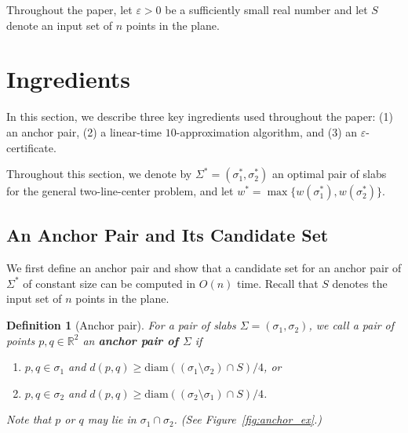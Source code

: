 \documentclass[10pt,a4paper]{article}
\newtheorem{definition}[theorem]{Definition}
\theoremstyle{star}
\theoremstyle{claimstar}
\newcommand{\eps}{\ensuremath{\varepsilon}}
\newcommand{\diam}{\ensuremath{\mathrm{diam}}}
\begin{document}
Throughout the paper, let $\eps > 0$ be a sufficiently small real number and let $S$ denote an input set of $n$ points in the plane.


\section{Ingredients}
\label{sec:polyeps}

In this section, we describe three key ingredients used throughout the paper: (1) an anchor pair, (2) a linear-time $10$-approximation algorithm, and (3) an $\eps$-certificate.




Throughout this section, we denote by $\Sigma^* = (\sigma_1^*, \sigma_2^*)$ an optimal pair of slabs for the general two-line-center problem, and let $w^* = \max \{w(\sigma_1^*), w(\sigma_2^*) \}$.

\subsection{An Anchor Pair and Its Candidate Set}
\label{sec:anchor_pair}
We first define an anchor pair and show that a candidate set for an anchor pair of $\Sigma^*$ of constant size can be computed in $O(n)$ time.
Recall that $S$ denotes the input set of $n$ points in the plane.

\begin{definition}[Anchor pair]
    For a pair of slabs $\Sigma = (\sigma_1, \sigma_2)$,
    we call a pair of points $p, q \in \mathbb R^2$ an \textbf{anchor pair of $\Sigma$} if 
    \begin{enumerate}[(1)]
        \item $p, q\in \sigma_1$ and $d(p, q) \ge \diam((\sigma_1 \setminus \sigma_2) \cap S)/4$, or 
        \item $p, q\in \sigma_2$ and $d(p, q) \ge \diam((\sigma_2 \setminus \sigma_1) \cap S)/4$.
    \end{enumerate}
     Note that $p$ or $q$ may lie in $\sigma_1\cap \sigma_2$. (See Figure~\ref{fig:anchor_ex}.)
\end{definition} 
\end{document}
